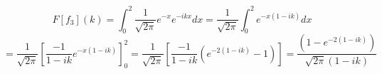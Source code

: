 \documentclass[11pt]{article}
\begin{document}
\vspace{2cm}

\[ F[f_3](k) = \int_{0}^{2} \frac{1}{\sqrt{2\pi}} e^{-x} e^{-ikx} dx =  \frac{1}{\sqrt{2\pi}} \int_{0}^{2} e^{-x(1-ik)} dx \]
\[ = \frac{1}{\sqrt{2\pi}} \left[\frac{-1}{1-ik} e^{-x(1-ik)}\right]_0^2 =  \frac{1}{\sqrt{2\pi}} \left[\frac{-1}{1-ik} (e^{-2(1-ik)} - 1)\right] = \frac{(1 - e^{-2(1-ik)})}{\sqrt{2\pi}(1-ik)} \]
\end{document}
